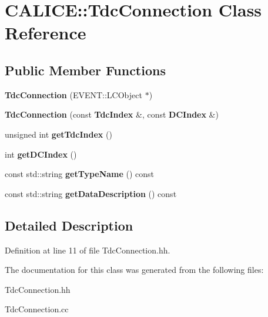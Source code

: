 \section{CALICE::TdcConnection Class Reference}
\label{classCALICE_1_1TdcConnection}
\subsection*{Public Member Functions}
\begin{DoxyCompactItemize}
\item 
{\bfseries TdcConnection} (EVENT::LCObject $\ast$)\label{classCALICE_1_1TdcConnection_a94c0e0c33f59e1d9b8198fa4f248bc63}

\item 
{\bfseries TdcConnection} (const {\bf TdcIndex} \&, const {\bf DCIndex} \&)\label{classCALICE_1_1TdcConnection_ae48d95c1cdfffc1b30e37f636cba4ee1}

\item 
unsigned int {\bfseries getTdcIndex} ()\label{classCALICE_1_1TdcConnection_ae5666c4cf9f57bebc75968e6c9e57931}

\item 
int {\bfseries getDCIndex} ()\label{classCALICE_1_1TdcConnection_a3cb6ff2b85705a238adb623419b7697f}

\item 
const std::string {\bfseries getTypeName} () const \label{classCALICE_1_1TdcConnection_ad7a9bc4b34f1053cab34962d432be7ea}

\item 
const std::string {\bfseries getDataDescription} () const \label{classCALICE_1_1TdcConnection_a6019c3b7b3a649cbb29db10c8ccd1281}

\end{DoxyCompactItemize}


\subsection{Detailed Description}


Definition at line 11 of file TdcConnection.hh.

The documentation for this class was generated from the following files:\begin{DoxyCompactItemize}
\item 
TdcConnection.hh\item 
TdcConnection.cc\end{DoxyCompactItemize}
